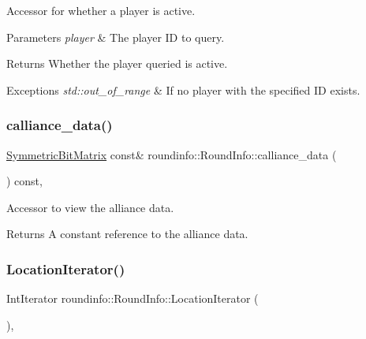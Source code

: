 Accessor for whether a player is active. 


\begin{DoxyParams}{Parameters}
{\em player} & The player ID to query. \\
\hline
\end{DoxyParams}
\begin{DoxyReturn}{Returns}
Whether the player queried is active. 
\end{DoxyReturn}

\begin{DoxyExceptions}{Exceptions}
{\em std\+::out\+\_\+of\+\_\+range} & If no player with the specified ID exists. \\
\hline
\end{DoxyExceptions}
\mbox{\label{classroundinfo_1_1_round_info_a0944e6bf6facb52e9955695ea0b3feb3}} 
\subsubsection{\texorpdfstring{calliance\+\_\+data()}{calliance\_data()}}
{\footnotesize\ttfamily \hyperlink{class_symmetric_bit_matrix}{Symmetric\+Bit\+Matrix} const\& roundinfo\+::\+Round\+Info\+::calliance\+\_\+data (\begin{DoxyParamCaption}{ }\end{DoxyParamCaption}) const\hspace{0.3cm}{\ttfamily [inline]}, {\ttfamily [noexcept]}}



Accessor to view the alliance data. 

\begin{DoxyReturn}{Returns}
A constant reference to the alliance data. 
\end{DoxyReturn}
\mbox{\label{classroundinfo_1_1_round_info_ab9e17ca5d68f9981862cbf540cc0b297}} 
\subsubsection{\texorpdfstring{Location\+Iterator()}{LocationIterator()}}
{\footnotesize\ttfamily Int\+Iterator roundinfo\+::\+Round\+Info\+::\+Location\+Iterator (\begin{DoxyParamCaption}{ }\end{DoxyParamCaption})\hspace{0.3cm}{\ttfamily [inline]}, {\ttfamily [noexcept]}}



